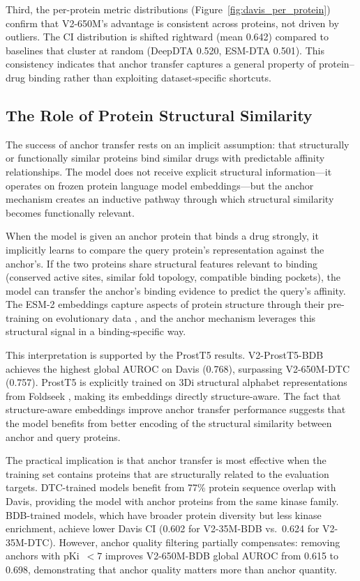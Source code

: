 Third, the per-protein metric distributions (Figure~\ref{fig:davis_per_protein}) confirm that V2-650M's advantage is consistent across proteins, not driven by outliers. The CI distribution is shifted rightward (mean 0.642) compared to baselines that cluster at random (DeepDTA 0.520, ESM-DTA 0.501). This consistency indicates that anchor transfer captures a general property of protein--drug binding rather than exploiting dataset-specific shortcuts.

\subsection{The Role of Protein Structural Similarity}

The success of anchor transfer rests on an implicit assumption: that structurally or functionally similar proteins bind similar drugs with predictable affinity relationships. The model does not receive explicit structural information---it operates on frozen protein language model embeddings---but the anchor mechanism creates an inductive pathway through which structural similarity becomes functionally relevant.

When the model is given an anchor protein that binds a drug strongly, it implicitly learns to compare the query protein's representation against the anchor's. If the two proteins share structural features relevant to binding (conserved active sites, similar fold topology, compatible binding pockets), the model can transfer the anchor's binding evidence to predict the query's affinity. The ESM-2 embeddings capture aspects of protein structure through their pre-training on evolutionary data \cite{lin2023esm2}, and the anchor mechanism leverages this structural signal in a binding-specific way.

This interpretation is supported by the ProstT5 results. V2-ProstT5-BDB achieves the highest global AUROC on Davis (0.768), surpassing V2-650M-DTC (0.757). ProstT5 \cite{heinzinger2023prostt5} is explicitly trained on 3Di structural alphabet representations from Foldseek \cite{van2024fast}, making its embeddings directly structure-aware. The fact that structure-aware embeddings improve anchor transfer performance suggests that the model benefits from better encoding of the structural similarity between anchor and query proteins.

The practical implication is that anchor transfer is most effective when the training set contains proteins that are structurally related to the evaluation targets. DTC-trained models benefit from 77\% protein sequence overlap with Davis, providing the model with anchor proteins from the same kinase family. BDB-trained models, which have broader protein diversity but less kinase enrichment, achieve lower Davis CI (0.602 for V2-35M-BDB vs.\ 0.624 for V2-35M-DTC). However, anchor quality filtering partially compensates: removing anchors with pKi~$< 7$ improves V2-650M-BDB global AUROC from 0.615 to 0.698, demonstrating that anchor quality matters more than anchor quantity.

